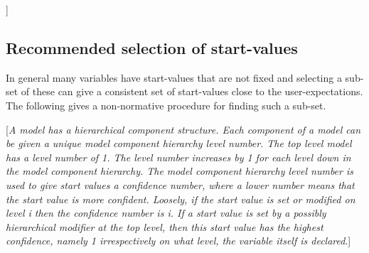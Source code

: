 {]}

\subsection{Recommended selection of start-values}

In general many variables have start-values that are not fixed and
selecting a sub-set of these can give a consistent set of start-values
close to the user-expectations. The following gives a non-normative
procedure for finding such a sub-set.

{[}\emph{A model has a hierarchical component structure. Each component
of a model can be given a unique model component hierarchy level number.
The top level model has a level number of 1. The level number increases
by 1 for each level down in the model component hierarchy. The model
component hierarchy level number is used to give start values a
confidence number, where a lower number means that the start value is
more confident. Loosely, if the start value is set or modified on level
i then the confidence number is i. If a start value is set by a possibly
hierarchical modifier at the top level, then this start value has the
highest confidence, namely 1 irrespectively on what level, the variable
itself is declared}.{]}
